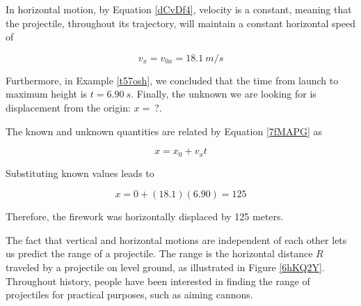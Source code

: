 \documentclass[main.tex]{subfiles}
\begin{document}
In horizontal motion, by Equation \eqref{dCvDf4}, velocity is a constant, meaning that the projectile, throughout its trajectory, will maintain a constant horizontal speed of 

\begin{equation*}
    v_x = v_{0x} = \SI{18.1}{m/s}
\end{equation*}


Furthermore, in Example \ref{t57osh}, we concluded that the time from launch to maximum height is $t = \SI{6.90}{s}$. Finally, the unknown we are looking for is displacement from the origin: $x =\ ?$.

\vspace{1em}

The known and unknown quantities are related by Equation \eqref{7fMAPG} as

\begin{equation*}
    x = x_0 + v_x t
\end{equation*}

Substituting known values leads to 

\begin{equation*}
    x = 0 + (18.1)(6.90) = 125 
\end{equation*}

Therefore, the firework was horizontally displaced by 125 meters.

\endsolution


The fact that vertical and horizontal motions are independent of each other lets us predict the range of a projectile. The \gls{range} is the horizontal distance $R$ traveled by a projectile on level ground, as illustrated in Figure \ref{6hKQ2Y}. Throughout history, people have been interested in finding the range of projectiles for practical purposes, such as aiming cannons.
\end{document}
